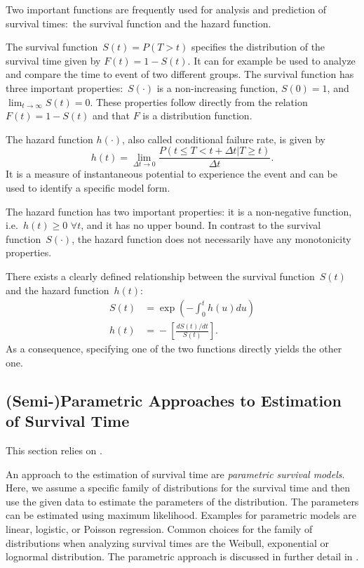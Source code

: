 \documentclass[12pt, a4paper]{scrartcl}
\theoremstyle{definition}
\theoremstyle{plain}
\numberwithin{equation}{section}
\numberwithin{figure}{section}
\numberwithin{table}{section}
\begin{document}
	
	Two important functions are frequently used for analysis and prediction of survival times:~the survival function and the hazard function.
	
	The survival function~$S(t) = P(T > t)$ specifies the distribution of the survival time given by $F(t) = 1 - S(t)$.
	It can for example be used to analyze and compare the time to event of two different groups.
	The survival function has three important properties:~$S(\cdot)$ is a non-increasing function, $S(0)=1$, and $\lim_{t \to \infty} S(t)=0$.
	These properties follow directly from the relation $F(t)=1-S(t)$ and that $F$ is a distribution function.
	
	The hazard function $h(\cdot)$, also called conditional failure rate, is given by
	\begin{equation*}
		h(t) = \lim_{\Delta t \to 0}\frac{P(t \leq T < t + \Delta t \vert T \geq t)}{\Delta t}.
	\end{equation*} 
	It is a measure of instantaneous potential to experience the event and can be used to identify a specific model form.
	
	The hazard function has two important properties: it is a non-negative function, i.e.~$h(t) \geq 0$ $ \forall t$, and it has no upper bound.
	In contrast to the survival function~$S(\cdot)$, the hazard function does not necessarily have any monotonicity properties.

	There exists a clearly defined relationship between the survival function~$S(t)$ and the hazard function~$h(t)$:
	\begin{equation*}
	\begin{split}
		S(t) &={} \exp \left( - \int_{0}^{t}h(u)du\right) \\
		h(t) & ={} - \left[ \frac{dS(t)/dt}{S(t)}\right].
	\end{split}
	\end{equation*}
	As a consequence, specifying one of the two functions directly yields the other one.

	
	\subsection{(Semi-)Parametric Approaches to Estimation of Survival Time} \label{cox}

	This section relies on \citet*{sabook}.
	
	An approach to the estimation of survival time are \emph{parametric survival models}.
	Here, we assume a specific family of distributions for the survival time and then use the given data to estimate the parameters of the distribution.
	The parameters can be estimated using maximum likelihood.
	Examples for parametric models are linear, logistic, or Poisson regression.
	Common choices for the family of distributions when analyzing survival times are the Weibull, exponential or lognormal distribution.
	The parametric approach is discussed in further detail in \citet*{sabook}.
	
\end{document}
